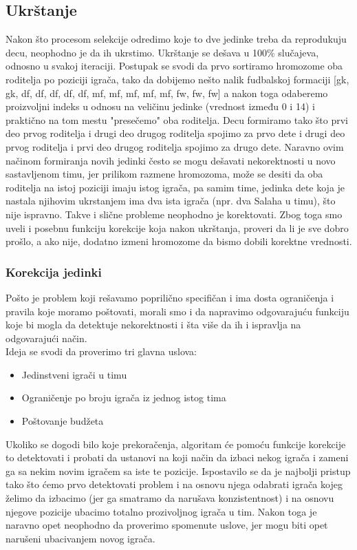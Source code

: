 \documentclass[a4paper]{article}
\begin{document}
\subsection{Ukrštanje}
Nakon što procesom selekcije odredimo koje to dve jedinke treba da reprodukuju decu, neophodno je da ih ukrstimo. Ukrštanje se dešava u 100\% slučajeva, odnosno u svakoj iteraciji. Postupak se svodi da prvo sortiramo hromozome oba roditelja po poziciji igrača, tako da dobijemo nešto nalik fudbalskoj formaciji [gk, gk, df, df, df, df, df, mf, mf, mf, mf, mf, fw, fw, fw] a nakon toga odaberemo proizvoljni indeks u odnosu na veličinu jedinke (vrednost između 0 i 14) i praktično na tom mestu "presečemo" oba roditelja. Decu formiramo tako što prvi deo prvog roditelja i drugi deo drugog roditelja spojimo za prvo dete i drugi deo prvog roditelja i prvi deo drugog roditelja spojimo za drugo dete. Naravno ovim načinom formiranja novih jedinki često se mogu dešavati nekorektnosti u novo sastavljenom timu, jer prilikom razmene hromozoma, može se desiti da oba roditelja na istoj poziciji imaju istog igrača, pa samim time, jedinka dete koja je nastala njihovim ukrstanjem ima dva ista igrača (npr. dva Salaha u timu), što nije ispravno. Takve i slične probleme neophodno je korektovati. Zbog toga smo uveli i posebnu funkciju korekcije koja nakon ukrštanja, proveri da li je sve dobro prošlo, a ako nije, dodatno izmeni hromozome da bismo dobili korektne vrednosti.

\subsubsection{Korekcija jedinki}
Pošto je problem koji rešavamo poprilično specifičan i ima dosta ograničenja i pravila koje moramo poštovati, morali smo i da napravimo odgovarajuću funkciju koje bi mogla da detektuje nekorektnosti i šta više da ih i ispravlja na odgovarajući način. \\
Ideja se svodi da proverimo tri glavna uslova:
\begin{itemize}
	\item Jedinstveni igrači u timu
	\item Ograničenje po broju igrača iz jednog istog tima
	\item Poštovanje budžeta
\end{itemize}

Ukoliko se dogodi bilo koje prekoračenja, algoritam će pomoću funkcije korekcije to detektovati i probati da ustanovi na koji način da izbaci nekog igrača i zameni ga sa nekim novim igračem sa iste te pozicije. Ispostavilo se da je najbolji pristup tako što ćemo prvo detektovati problem i na osnovu njega odabrati igrača kojeg želimo da izbacimo (jer ga smatramo da narušava konzistentnost) i na osnovu njegove pozicije ubacimo totalno prozivoljnog igrača u tim. Nakon toga je naravno opet neophodno da proverimo spomenute uslove, jer mogu biti opet narušeni ubacivanjem novog igrača.
\end{document}
